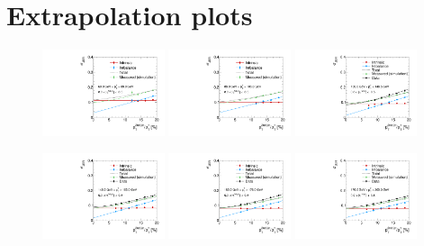 \section{Extrapolation plots}
\label{res:app:extrapolationPlots}
\begin{figure}[!h]
 \centering
    \includegraphics[width=0.32\textwidth]{figures/resolution/results/JER_for_1_eta_bin_3_pTGamma_bin_all_contributions_PFCHS_RMS99_mc.pdf}
    \includegraphics[width=0.32\textwidth]{figures/resolution/results/JER_for_1_eta_bin_4_pTGamma_bin_all_contributions_PFCHS_RMS99_mc.pdf}
    \includegraphics[width=0.32\textwidth]{figures/resolution/results/JER_for_1_eta_bin_5_pTGamma_bin_all_contributions_PFCHS_RMS99_mc.pdf}

    \includegraphics[width=0.32\textwidth]{figures/resolution/results/JER_for_1_eta_bin_6_pTGamma_bin_all_contributions_PFCHS_RMS99_mc.pdf}
    \includegraphics[width=0.32\textwidth]{figures/resolution/results/JER_for_1_eta_bin_7_pTGamma_bin_all_contributions_PFCHS_RMS99_mc.pdf}
    \includegraphics[width=0.32\textwidth]{figures/resolution/results/JER_for_1_eta_bin_8_pTGamma_bin_all_contributions_PFCHS_RMS99_mc.pdf}


\end{figure}
